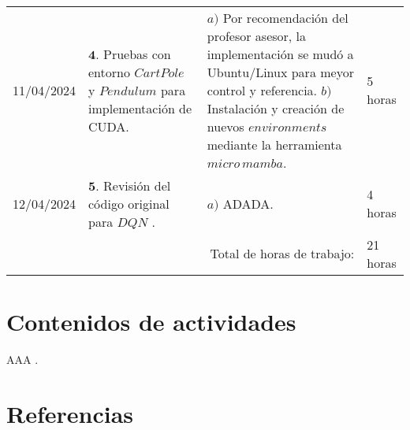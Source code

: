 \documentclass[12pt]{article}
\begin{document}
\hfill\\
\begin{minipage}[h]{\textwidth}
	\centering
	\begin{tabularx}{\textwidth}{|p{2cm}|X|X|p{2cm}|} 
		\hline		
		
	 	11/04/2024 & 
	 	$\mathbf{4}.$ Pruebas con entorno $CartPole$ y $Pendulum$ para implementación de CUDA. &
	 	$a)$ Por recomendación del profesor asesor, la implementación se mudó a Ubuntu/Linux para meyor control y referencia. \newline
	 	$b)$ Instalación y creación de nuevos $environments$ mediante la herramienta $micro\, mamba$. \newline & 
	 	5 horas \\
	 	12/04/2024 & 
	 	$\mathbf{5}.$ Revisión del código original para $DQN$ \cite{DQNCart}. &
	 	$a)$ ADADA. \newline & 
	 	4 horas \\
	 	
	 	\hline
		\multicolumn{3}{|r|}{Total de horas de trabajo:} & 21 horas \\ 
	 	\hline                 
	\end{tabularx}
\end{minipage}




\section*{Contenidos de actividades}

AAA \cite{DQNCart}.


\newpage

\section*{Referencias}
\renewcommand\refname{}


\end{document}
